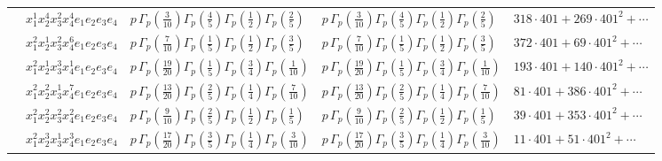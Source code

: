 \documentclass[11pt]{article}
\begin{document}
\begin{table}[ht]
{\begin{tabular}{@{}lllll@{}}
 & $x_{1}^{1} x_{2}^{4} x_{3}^{2} x_{4}^{4}  e_{1} e_{2} e_{3} e_{4}$ & $p \, \Gamma_p \left( \frac{3}{10} \right) \Gamma_p \left( \frac{4}{5} \right) \Gamma_p \left( \frac{1}{2} \right) \Gamma_p \left( \frac{2}{5} \right)$ & $p \, \Gamma_p \left( \frac{3}{10} \right) \Gamma_p \left( \frac{4}{5} \right) \Gamma_p \left( \frac{1}{2} \right) \Gamma_p \left( \frac{2}{5} \right)$ & $318{\cdot}401{+}269{\cdot}401^{2}{+}\cdots$ \\
 & $x_{1}^{2} x_{2}^{1} x_{3}^{2} x_{4}^{6}  e_{1} e_{2} e_{3} e_{4}$ & $p \, \Gamma_p \left( \frac{7}{10} \right) \Gamma_p \left( \frac{1}{5} \right) \Gamma_p \left( \frac{1}{2} \right) \Gamma_p \left( \frac{3}{5} \right)$ & $p \, \Gamma_p \left( \frac{7}{10} \right) \Gamma_p \left( \frac{1}{5} \right) \Gamma_p \left( \frac{1}{2} \right) \Gamma_p \left( \frac{3}{5} \right)$ & $372{\cdot}401{+}69{\cdot}401^{2}{+}\cdots$ \\
 & $x_{1}^{2} x_{2}^{1} x_{3}^{3} x_{4}^{1}  e_{1} e_{2} e_{3} e_{4}$ & $p \, \Gamma_p \left( \frac{19}{20} \right) \Gamma_p \left( \frac{1}{5} \right) \Gamma_p \left( \frac{3}{4} \right) \Gamma_p \left( \frac{1}{10} \right)$ & $p \, \Gamma_p \left( \frac{19}{20} \right) \Gamma_p \left( \frac{1}{5} \right) \Gamma_p \left( \frac{3}{4} \right) \Gamma_p \left( \frac{1}{10} \right)$ & $193{\cdot}401{+}140{\cdot}401^{2}{+}\cdots$ \\
 & $x_{1}^{2} x_{2}^{2} x_{3}^{1} x_{4}^{7}  e_{1} e_{2} e_{3} e_{4}$ & $p \, \Gamma_p \left( \frac{13}{20} \right) \Gamma_p \left( \frac{2}{5} \right) \Gamma_p \left( \frac{1}{4} \right) \Gamma_p \left( \frac{7}{10} \right)$ & $p \, \Gamma_p \left( \frac{13}{20} \right) \Gamma_p \left( \frac{2}{5} \right) \Gamma_p \left( \frac{1}{4} \right) \Gamma_p \left( \frac{7}{10} \right)$ & $81{\cdot}401{+}386{\cdot}401^{2}{+}\cdots$ \\
 & $x_{1}^{2} x_{2}^{2} x_{3}^{2} x_{4}^{2}  e_{1} e_{2} e_{3} e_{4}$ & $p \, \Gamma_p \left( \frac{9}{10} \right) \Gamma_p \left( \frac{2}{5} \right) \Gamma_p \left( \frac{1}{2} \right) \Gamma_p \left( \frac{1}{5} \right)$ & $p \, \Gamma_p \left( \frac{9}{10} \right) \Gamma_p \left( \frac{2}{5} \right) \Gamma_p \left( \frac{1}{2} \right) \Gamma_p \left( \frac{1}{5} \right)$ & $39{\cdot}401{+}353{\cdot}401^{2}{+}\cdots$ \\
 & $x_{1}^{2} x_{2}^{3} x_{3}^{1} x_{4}^{3}  e_{1} e_{2} e_{3} e_{4}$ & $p \, \Gamma_p \left( \frac{17}{20} \right) \Gamma_p \left( \frac{3}{5} \right) \Gamma_p \left( \frac{1}{4} \right) \Gamma_p \left( \frac{3}{10} \right)$ & $p \, \Gamma_p \left( \frac{17}{20} \right) \Gamma_p \left( \frac{3}{5} \right) \Gamma_p \left( \frac{1}{4} \right) \Gamma_p \left( \frac{3}{10} \right)$ & $11{\cdot}401{+}51{\cdot}401^{2}{+}\cdots$ \\

\end{tabular}}
\end{table}
\end{document}
